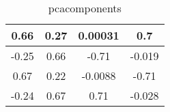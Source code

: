 \begin{table}[h]
  \centering
    \begin{tabular}{|c|c|c|c|} \hline
      0.66 & 0.27 & 0.00031 & 0.7\\ \hline
      -0.25 & 0.66 & -0.71 & -0.019\\ \hline
      0.67 & 0.22 & -0.0088 & -0.71\\ \hline
      -0.24 & 0.67 & 0.71 & -0.028\\ \hline
    \end{tabular}
  \caption{pcacomponents}
  \label{tab:pca_components}
\end{table}
